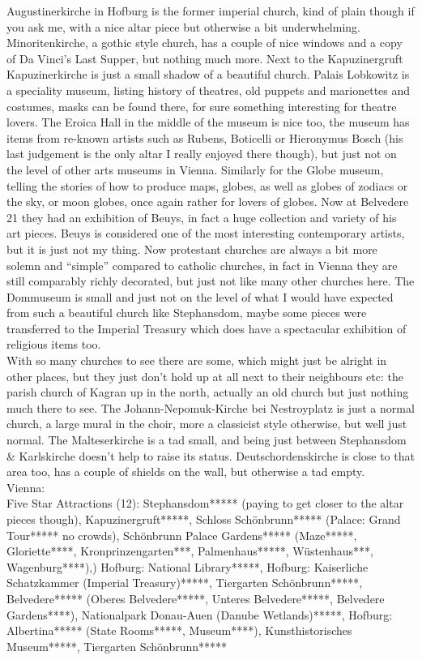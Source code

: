 Augustinerkirche in Hofburg is the former imperial church, kind of plain though if you ask me, with a nice altar piece but otherwise a bit underwhelming. Minoritenkirche, a gothic style church, has a couple of nice windows and a copy of Da Vinci's Last Supper, but nothing much more. Next to the Kapuzinergruft Kapuzinerkirche is just a small shadow of a beautiful church. Palais Lobkowitz is a speciality museum, listing history of theatres, old puppets and marionettes and costumes, masks can be found there, for sure something interesting for theatre lovers. The Eroica Hall in the middle of the museum is nice too, the museum has items from re-known artists such as Rubens, Boticelli or Hieronymus Bosch (his last judgement is the only altar I really enjoyed there though), but just not on the level of other arts museums in Vienna. Similarly for the Globe museum, telling the stories of how to produce maps, globes, as well as globes of zodiacs or the sky, or moon globes, once again rather for lovers of globes. Now at Belvedere 21 they had an exhibition of Beuys, in fact a huge collection and variety of his art pieces. Beuys is considered one of the most interesting contemporary artists, but it is just not my thing. Now protestant churches are always a bit more solemn and ``simple'' compared to catholic churches, in fact in Vienna they are still comparably richly decorated, but just not like many other churches here. The Dommuseum is small and just not on the level of what I would have expected from such a beautiful church like Stephansdom, maybe some pieces were transferred to the Imperial Treasury which does have a spectacular exhibition of religious items too.\\

With so many churches to see there are some, which might just be alright in other places, but they just don't hold up at all next to their neighbours etc: the parish church of Kagran up in the north, actually an old church but just nothing much there to see. The Johann-Nepomuk-Kirche bei Nestroyplatz is just a normal church, a large mural in the choir, more a classicist style otherwise, but well just normal. The Malteserkirche is a tad small, and being just between Stephansdom \& Karlskirche doesn't help to raise its status. Deutschordenskirche is close to that area too, has a couple of shields on the wall, but otherwise a tad empty.\\


Vienna: \\
Five Star Attractions (12): Stephansdom***** (paying to get closer to the altar pieces though), Kapuzinergruft*****, Schloss Sch\"onbrunn***** (Palace: Grand Tour***** no crowds), Sch\"onbrunn Palace Gardens***** (Maze*****, Gloriette****, Kronprinzengarten***, Palmenhaus*****, W\"ustenhaus***, Wagenburg****),) Hofburg: National Library*****, Hofburg: Kaiserliche Schatzkammer (Imperial Treasury)*****, Tiergarten Sch\"onbrunn*****, Belvedere***** (Oberes Belvedere*****, Unteres Belvedere*****, Belvedere Gardens****), Nationalpark Donau-Auen (Danube Wetlands)*****, Hofburg: Albertina***** (State Rooms*****, Museum****),  Kunsthistorisches Museum*****, Tiergarten Sch\"onbrunn*****\\

